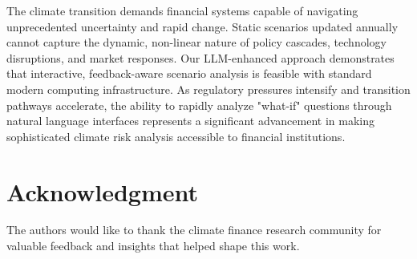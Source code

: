 \documentclass[conference]{IEEEtran}
\begin{document}
The climate transition demands financial systems capable of navigating unprecedented uncertainty and rapid change. Static scenarios updated annually cannot capture the dynamic, non-linear nature of policy cascades, technology disruptions, and market responses. Our LLM-enhanced approach demonstrates that interactive, feedback-aware scenario analysis is feasible with standard modern computing infrastructure. As regulatory pressures intensify and transition pathways accelerate, the ability to rapidly analyze "what-if" questions through natural language interfaces represents a significant advancement in making sophisticated climate risk analysis accessible to financial institutions.

\section*{Acknowledgment}

The authors would like to thank the climate finance research community for valuable feedback and insights that helped shape this work.
\end{document}
